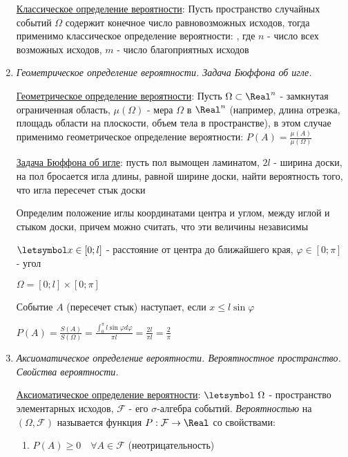 \begin{enumerate}
    \hyperlink{classicdefinitionofprobability}{Классическое определение вероятности}: Пусть пространство случайных событий $\Omega$ содержит конечное число равновозможных исходов,
    тогда применимо классическое определение вероятности: , где $n$ - число всех возможных исходов, $m$ - число благоприятных исходов

    \item \textit{Геометрическое определение вероятности. Задача Бюффона об игле.}

    \hyperlink{geometricdefinitionofprobability}{Геометрическое определение вероятности}: Пусть $\Omega \subset \Real^n$ - замкнутая ограниченная область,
    $\mu(\Omega)$ - мера $\Omega$ в $\Real^n$ (например, длина отрезка, площадь области на плоскости, объем тела в пространстве), в этом случае применимо геометрическое определение вероятности: $P(A) = \frac{\mu(A)}{\mu(\Omega)}$

    \hyperlink{buffonsproblem}{Задача Бюффона об игле}: пусть пол вымощен ламинатом, $2l$ - ширина доски, на пол бросается игла длины, равной ширине доски,
    найти вероятность того, что игла пересечет стык доски

    Определим положение иглы координатами центра и углом, между иглой и стыком доски, причем можно считать, что эти величины независимы

    $\letsymbol x \in [0; l]$ - расстояние от центра до ближайшего края, $\varphi \in [0; \pi]$ - угол

    $\Omega = [0; l] \times [0; \pi]$

    Событие $A$ (пересечет стык) наступает, если $x \leq l \sin \varphi$

    $P(A) = \frac{S(A)}{S(\Omega)} = \frac{\int_0^\pi l \sin \varphi d \varphi}{\pi l} = \frac{2l}{\pi l} = \frac{2}{\pi}$

    \item \textit{Аксиоматическое определение вероятности. Вероятностное пространство. Свойства вероятности.}

    \hyperlink{axiomaticdefinitionofprobability}{Аксиоматическое определение вероятности}: $\letsymbol\ \Omega$ - пространство элементарных исходов, $\mathcal{F}$ - его $\sigma$-алгебра событий.
    \textit{Вероятностью} на $(\Omega, \mathcal{F})$ называется функция $P: \mathcal{F} \to \Real$ со свойствами:

    \begin{enumerate}
        \item $P(A) \geq 0 \quad \forall A \in \mathcal{F}$ (неотрицательность)


\end{enumerate}
\end{enumerate}
